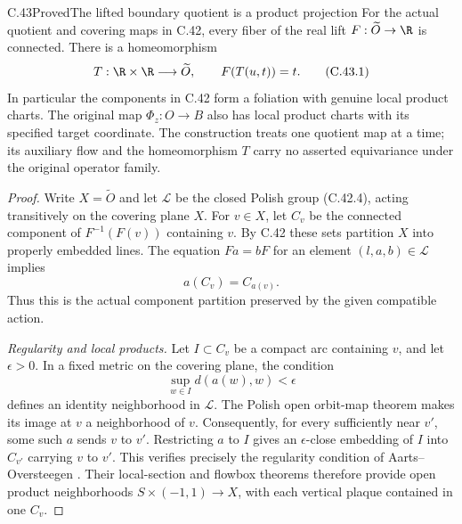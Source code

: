 \begin{claim}{C.43}{Proved}{The lifted boundary quotient is a product projection}
For the actual quotient and covering maps in C.42, every
fiber of the real lift
$F:\widetilde O\to\R$ is connected.
There is a homeomorphism
\[
 T:\R\times\R\longrightarrow\widetilde O,
 \qquad F(T(u,t))=t.                                    \tag{C.43.1}
\]
In particular the components in C.42 form a foliation
with genuine local product charts. The original map
$\Phi_z:O\to B$ also has local product charts with its
specified target coordinate. The construction treats
one quotient map at a time; its auxiliary flow and
the homeomorphism $T$ carry no asserted equivariance
under the original operator family.
\end{claim}

\begin{proof}
Write $X=\widetilde O$ and let $\mathcal L$ be the
closed Polish group (C.42.4), acting transitively on
the covering plane $X$. For $v\in X$, let $C_v$ be
the connected component of $F^{-1}(F(v))$ containing
$v$. By C.42 these sets partition $X$ into properly
embedded lines. The equation $Fa=bF$ for an element
$(l,a,b)\in\mathcal L$ implies
\[
                         a(C_v)=C_{a(v)}.                \tag{C.43.2}
\]
Thus this is the actual component partition preserved
by the given compatible action.

\emph{Regularity and local products.}
Let $I\subset C_v$ be a compact arc containing $v$,
and let $\epsilon>0$. In a fixed metric on the
covering plane, the condition
\[
       \sup_{w\in I}d(a(w),w)<\epsilon
\]
defines an identity neighborhood in $\mathcal L$.
The Polish open orbit-map theorem makes its image
at $v$ a neighborhood of $v$. Consequently, for
every sufficiently near $v'$, some such $a$ sends
$v$ to $v'$. Restricting $a$ to $I$ gives an
$\epsilon$-close embedding of $I$ into $C_{v'}$
carrying $v$ to $v'$. This verifies precisely the
regularity condition of Aarts--Oversteegen
\cite[Definition 5.3]{C_AartsOversteegen1991}.
Their local-section and flowbox theorems
\cite[Theorems 5.6--5.7]{C_AartsOversteegen1991}
therefore provide open product neighborhoods
$S\times(-1,1)\to X$, with each vertical plaque
contained in one $C_v$.


\end{proof}

